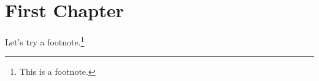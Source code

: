 \documentclass[
    fontsize=12,
    paper=letter,
    twoside=true,  %
    open=right,
    usegeometry=true  %
  ]{scrbook}
\begin{document}
\chapter{First Chapter}
Let's try a footnote.\footnote{This is a footnote.}

\blindtext

\blinddocument
\end{document}
